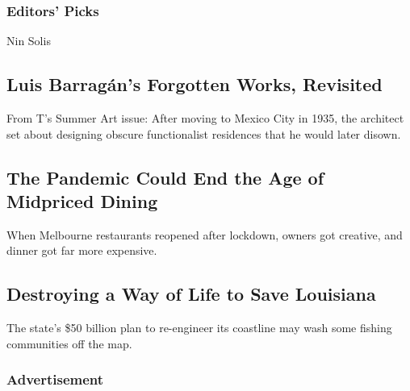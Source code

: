 \hypertarget{editors-picks}{%
\subsubsection{Editors' Picks}\label{editors-picks}}

\href{/2020/07/24/t-magazine/luis-barragan.html}{}

Nin Solis

\href{/2020/07/24/t-magazine/luis-barragan.html}{}

\hypertarget{luis-barraguxe1ns-forgotten-works-revisited}{%
\subsection{Luis Barragán's Forgotten Works,
Revisited}\label{luis-barraguxe1ns-forgotten-works-revisited}}

From T's Summer Art issue: After moving to Mexico City in 1935, the
architect set about designing obscure functionalist residences that he
would later disown.

\href{/2020/07/28/dining/melbourne-restaurants-coronavirus.html}{}

\hypertarget{the-pandemic-could-end-the-age-of-midpriced-dining}{%
\subsection{The Pandemic Could End the Age of Midpriced
Dining}\label{the-pandemic-could-end-the-age-of-midpriced-dining}}

When Melbourne restaurants reopened after lockdown, owners got creative,
and dinner got far more expensive.

\href{/2020/07/28/dining/melbourne-restaurants-coronavirus.html}{}

\href{/interactive/2020/07/21/magazine/louisiana-coast-engineering.html}{}

\hypertarget{destroying-a-way-of-life-to-save-louisiana}{%
\subsection{Destroying a Way of Life to Save
Louisiana}\label{destroying-a-way-of-life-to-save-louisiana}}

The state's \$50 billion plan to re-engineer its coastline may wash some
fishing communities off the map.

\href{/interactive/2020/07/21/magazine/louisiana-coast-engineering.html}{}

\hypertarget{advertisement}{%
\subsubsection{Advertisement}\label{advertisement}}

